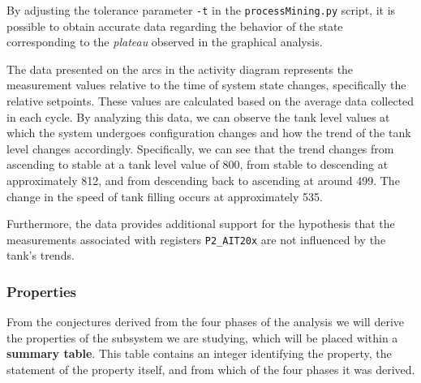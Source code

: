 By adjusting the tolerance parameter \texttt{-t} in the \texttt{processMining.py} script, it is possible to obtain accurate data regarding the behavior of the state corresponding to the \textit{plateau} observed in the graphical analysis.

\bigskip
The data presented on the arcs in the activity diagram represents the measurement values relative to the time of system state changes, specifically the relative setpoints. These values are calculated based on the average data collected in each cycle. By analyzing this data, we can observe the tank level values at which the system undergoes configuration changes and how the trend of the tank level changes accordingly. Specifically, we can see that the trend changes from ascending to stable at a tank level value of 800, from stable to descending at approximately 812, and from descending back to ascending at around 499. The change in the speed of tank filling occurs at approximately 535.

\bigskip
Furthermore, the data provides additional support for the hypothesis that the measurements associated with registers \texttt{P2\_AIT20x} are not influenced by the tank's trends.

\subsubsection{Properties}
\label{subsubsec:6_P1P2_summary_table}
From the conjectures derived from the four phases of the analysis we will derive the properties of the subsystem we are studying, which will be placed within a \textbf{summary table}. This table contains an integer identifying the property, the statement of the property itself, and from which of the four phases it was derived.

